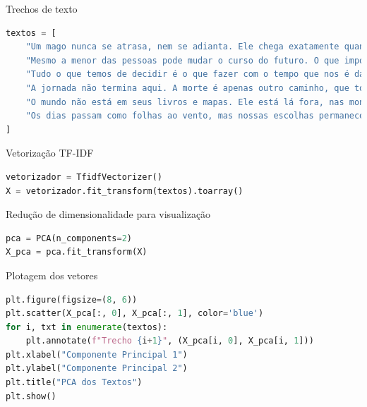 Trechos de texto
\begin{lstlisting}[language=Python, style=input]
textos = [ 
    "Um mago nunca se atrasa, nem se adianta. Ele chega exatamente quando pretende chegar, pois o tempo dos magos não é o mesmo dos homens. Quando ele chega, é o momento certo.", 
    "Mesmo a menor das pessoas pode mudar o curso do futuro. O que importa não é o tamanho ou a força, mas a coragem que se tem de seguir um caminho que poucos ousariam.", 
    "Tudo o que temos de decidir é o que fazer com o tempo que nos é dado. O que está em nossas mãos, ao fim das contas, é como escolhemos usar os momentos que temos para afetar o que está à nossa volta.", 
    "A jornada não termina aqui. A morte é apenas outro caminho, que todos temos que trilhar. Cada um de nós, por mais que deseje evitar, um dia terá que enfrentar o fim, mas o que fazemos enquanto vivemos é o que realmente importa.", 
    "O mundo não está em seus livros e mapas. Ele está lá fora, nas montanhas, nas florestas e nas planícies. Não se limita ao que você pode ver com os olhos, mas ao que você está disposto a explorar e descobrir.", 
    "Os dias passam como folhas ao vento, mas nossas escolhas permanecem. O que fizemos e as decisões que tomamos, seja na alegria ou na dor, ecoam por todo o nosso caminho e deixam uma marca no que está por vir."
]
\end{lstlisting}

Vetorização TF-IDF

\begin{lstlisting}[language=Python, style=input]
vetorizador = TfidfVectorizer()
X = vetorizador.fit_transform(textos).toarray()
\end{lstlisting}

Redução de dimensionalidade para visualização

\begin{lstlisting}[language=Python, style=input]
pca = PCA(n_components=2)
X_pca = pca.fit_transform(X)
\end{lstlisting}

Plotagem dos vetores

\begin{lstlisting}[language=Python, style=input]
plt.figure(figsize=(8, 6))
plt.scatter(X_pca[:, 0], X_pca[:, 1], color='blue')
for i, txt in enumerate(textos):
    plt.annotate(f"Trecho {i+1}", (X_pca[i, 0], X_pca[i, 1]))
plt.xlabel("Componente Principal 1")
plt.ylabel("Componente Principal 2")
plt.title("PCA dos Textos")
plt.show()
\end{lstlisting}

